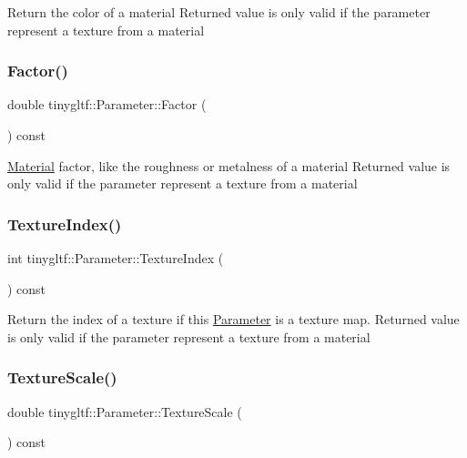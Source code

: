 Return the color of a material Returned value is only valid if the parameter represent a texture from a material \mbox{\label{structtinygltf_1_1Parameter_adc4de712403e8e7cfab1340409b103b8}} 
\subsubsection{\texorpdfstring{Factor()}{Factor()}}
{\footnotesize\ttfamily double tinygltf\+::\+Parameter\+::\+Factor (\begin{DoxyParamCaption}{ }\end{DoxyParamCaption}) const\hspace{0.3cm}{\ttfamily [inline]}}

\hyperlink{structtinygltf_1_1Material}{Material} factor, like the roughness or metalness of a material Returned value is only valid if the parameter represent a texture from a material \mbox{\label{structtinygltf_1_1Parameter_a042b94ab31b2a1a76956765cdf560a87}} 
\subsubsection{\texorpdfstring{Texture\+Index()}{TextureIndex()}}
{\footnotesize\ttfamily int tinygltf\+::\+Parameter\+::\+Texture\+Index (\begin{DoxyParamCaption}{ }\end{DoxyParamCaption}) const\hspace{0.3cm}{\ttfamily [inline]}}

Return the index of a texture if this \hyperlink{structtinygltf_1_1Parameter}{Parameter} is a texture map. Returned value is only valid if the parameter represent a texture from a material \mbox{\label{structtinygltf_1_1Parameter_a4e50edb053c78f7c947578ad5c562cd5}} 
\subsubsection{\texorpdfstring{Texture\+Scale()}{TextureScale()}}
{\footnotesize\ttfamily double tinygltf\+::\+Parameter\+::\+Texture\+Scale (\begin{DoxyParamCaption}{ }\end{DoxyParamCaption}) const\hspace{0.3cm}{\ttfamily [inline]}}


